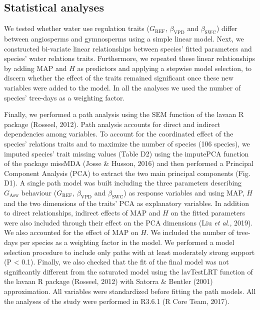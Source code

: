 \documentclass[11pt,twoside]{reedthesis}
\begin{document}
\subsection{Statistical analyses}\label{statistical-analyses}

We tested whether water use regulation traits (\(G_{\text{REF}}\),
\(\beta_{\text{VPD}}\) and \(\beta_{\text{SWC}}\)) differ between
angiosperms and gymnosperms using a simple linear model. Next, we
constructed bi-variate linear relationships between species' fitted
parameters and species' water relations traits. Furthermore, we repeated
these linear relationships by adding MAP and \(H\) as predictors and
applying a stepwise model selection, to discern whether the effect of
the traits remained significant once these new variables were added to
the model. In all the analyses we used the number of species' tree-days
as a weighting factor.\par

Finally, we performed a path analysis using the SEM function of the
lavaan R package (Rosseel, 2012). Path analysis accounts for direct and
indirect dependencies among variables. To account for the coordinated
effect of the species' relations traits and to maximize the number of
species (106 species), we imputed species' trait missing values (Table
D2) using the imputePCA function of the package missMDA (Josse \&
Husson, 2016) and then performed a Principal Component Analysis (PCA) to
extract the two main principal components (Fig. D1). A single path model
was built including the three parameters describing \(G_{\text{Asw}}\)
behaviour (\(G_{\text{REF}}\), \(\beta_{\text{VPD}}\) and
\(\beta_{\text{SWC}}\)) as response variables and using MAP, \(H\) and
the two dimensions of the traits' PCA as explanatory variables. In
addition to direct relationships, indirect effects of MAP and \(H\) on
the fitted parameters were also included through their effect on the PCA
dimensions (Liu \emph{et al.}, 2019). We also accounted for the effect
of MAP on \(H\). We included the number of tree-days per species as a
weighting factor in the model. We performed a model selection procedure
to include only paths with at least moderately strong support (P
\textless{} 0.1). Finally, we also checked that the fit of the final
model was not significantly different from the saturated model using the
lavTestLRT function of the lavaan R package (Rosseel, 2012) with Satorra
\& Bentler (2001) approximation. All variables were standardized before
fitting the path models. All the analyses of the study were performed in
R3.6.1 (R Core Team, 2017).\par
\end{document}
